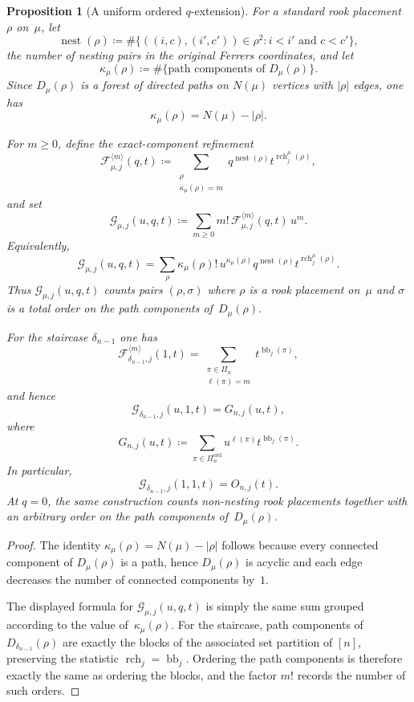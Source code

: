 \documentclass[11pt,reqno]{amsart}
\newtheorem{proposition}[theorem]{Proposition}
\theoremstyle{definition}
\begin{document}
\begin{proposition}[A uniform ordered $q$-extension]\label{prop:ferrers_ordered_q}
For a standard rook placement $\rho$ on~$\mu$, let
\[
  \operatorname{nest}(\rho)
  \coloneqq
  \#\{((i,c),(i',c')) \in \rho^2 : i < i' \text{ and } c < c'\},
\]
the number of nesting pairs in the original Ferrers coordinates, and let
\[
  \kappa_\mu(\rho)
  \coloneqq
  \#\{\text{path components of } D_\mu(\rho)\}.
\]
Since $D_\mu(\rho)$ is a forest of directed paths on $N(\mu)$ vertices with
$|\rho|$ edges, one has
\[
  \kappa_\mu(\rho) = N(\mu) - |\rho|.
\]

For $m \geq 0$, define the exact-component refinement
\[
  \mathcal F_{\mu,j}^{\langle m \rangle}(q,t)
  \coloneqq
  \sum_{\substack{\rho \\ \kappa_\mu(\rho)=m}}
  q^{\operatorname{nest}(\rho)} t^{\operatorname{rch}^{\mu}_j(\rho)},
\]
and set
\[
  \mathcal G_{\mu,j}(u,q,t)
  \coloneqq
  \sum_{m \geq 0} m!\,\mathcal F_{\mu,j}^{\langle m \rangle}(q,t)\,u^m.
\]
Equivalently,
\[
  \mathcal G_{\mu,j}(u,q,t)
  =
  \sum_{\rho}
  \kappa_\mu(\rho)!\,u^{\kappa_\mu(\rho)}
  q^{\operatorname{nest}(\rho)}
  t^{\operatorname{rch}^{\mu}_j(\rho)}.
\]
Thus $\mathcal G_{\mu,j}(u,q,t)$ counts pairs $(\rho,\sigma)$ where
$\rho$ is a rook placement on~$\mu$ and $\sigma$ is a total order on the
path components of~$D_\mu(\rho)$.

For the staircase $\delta_{n-1}$ one has
\[
  \mathcal F_{\delta_{n-1},j}^{\langle m \rangle}(1,t)
  =
  \sum_{\substack{\pi \in \Pi_n \\ \ell(\pi)=m}}
  t^{\operatorname{bb}_j(\pi)},
\]
and hence
\[
  \mathcal G_{\delta_{n-1},j}(u,1,t) = G_{n,j}(u,t),
\]
where
\[
  G_{n,j}(u,t)
  \coloneqq
  \sum_{\pi \in \Pi_n^{\operatorname{ord}}}
  u^{\ell(\pi)} t^{\operatorname{bb}_j(\pi)}.
\]
In particular,
\[
  \mathcal G_{\delta_{n-1},j}(1,1,t) = O_{n,j}(t).
\]
At $q=0$, the same construction counts non-nesting rook placements together
with an arbitrary order on the path components of~$D_\mu(\rho)$.
\end{proposition}
\begin{proof}
The identity $\kappa_\mu(\rho)=N(\mu)-|\rho|$ follows because every connected
component of $D_\mu(\rho)$ is a path, hence $D_\mu(\rho)$ is acyclic and each
edge decreases the number of connected components by~$1$.

The displayed formula for $\mathcal G_{\mu,j}(u,q,t)$ is simply the same sum
grouped according to the value of~$\kappa_\mu(\rho)$.
For the staircase, path components of $D_{\delta_{n-1}}(\rho)$ are exactly the
blocks of the associated set partition of $[n]$, preserving the statistic
\(\operatorname{rch}_j = \operatorname{bb}_j\).
Ordering the path components is therefore exactly the same as ordering the
blocks, and the factor $m!$ records the number of such orders.
\end{proof}
\end{document}
